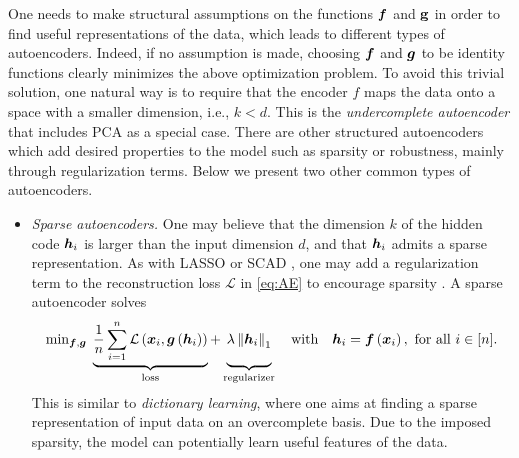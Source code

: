 One needs to make structural assumptions on the functions $\text{\boldmath $f$}$ and $\mathrm{\bf g}$ in order to find useful representations of the data, which leads to different types of autoencoders. Indeed, if no assumption is made, choosing $\text{\boldmath $f$}$ and $\text{\boldmath $g$}$ to be identity functions clearly minimizes the above optimization problem. To avoid this trivial solution, one natural way is to require that the encoder $f$ maps the data onto a space with a smaller dimension, i.e., $k < d$. This is the \textit{undercomplete autoencoder} that includes PCA as a special case. There are other structured autoencoders which add desired properties to the model such as sparsity or robustness, mainly through regularization terms. Below we present two other common types of autoencoders.

\begin{itemize}
\item \emph{Sparse autoencoders. } One may believe that the dimension $k$ of the hidden code $\text{\boldmath $h$}_i$ is larger than the input dimension $d$, and that $\text{\boldmath $h$}_i$ admits a sparse representation. As with LASSO \citep{tibshirani1996regression} or SCAD \citep{fan2001variable}, one may add a regularization term to the reconstruction loss $\mathcal{L}$ in \eqref{eq:AE} to encourage sparsity \citep{poultney2007efficient}. A sparse autoencoder solves
\begin{equation*}
\mbox{min}_{\ff,\bgg}  \; \underbrace{ \frac{1}{n}\sum_{i=1}^{n}\mathcal{L}\left(\bm{x}_{i},\bgg\left(\bm{h}_{i}\right)\right) }_{\text{loss}}+ \underbrace{\vphantom{\frac{1}{n}\sum_{i=1}^{n}\mathcal{L}\left(\bm{x}_{i},\bgg\left(\bm{h}_{i}\right)\right)} \lambda\left\Vert \bm{h}_{i}\right\Vert _{1} }_{\text{regularizer}} \quad \text{with} \quad \bm{h}_{i}=\ff\left(\bm{x}_{i}\right), \text{ for all } i \in [n].
\end{equation*}
This is similar to \textit{dictionary learning}, where one aims at finding a sparse representation of input data on an overcomplete basis. Due to the imposed sparsity, the model can potentially learn useful features of the data.


\end{itemize}
